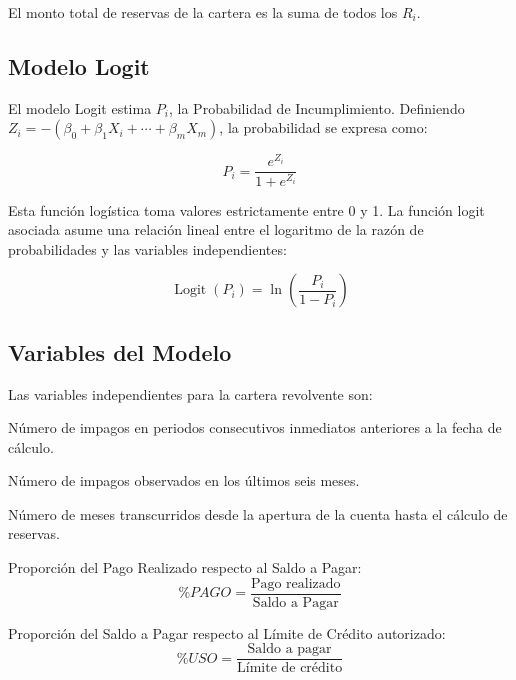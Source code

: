 El monto total de reservas de la cartera es la suma de todos los $R_i$.

\subsection{Modelo Logit}

El modelo Logit estima $P_i$, la Probabilidad de Incumplimiento. Definiendo $Z_i = -(\beta_0 + \beta_1 X_i + \cdots + \beta_m X_m)$, la probabilidad se expresa como:

\begin{equation}
    P_i = \frac{e^{Z_i}}{1 + e^{Z_i}}
\end{equation}

Esta función logística toma valores estrictamente entre 0 y 1. La función logit asociada asume una relación lineal entre el logaritmo de la razón de probabilidades y las variables independientes:

\begin{equation}
    \operatorname{Logit}(P_i) = \ln\!\left(\frac{P_i}{1 - P_i}\right)
\end{equation}

\subsection{Variables del Modelo}

Las variables independientes para la cartera revolvente son:

\begin{description}[leftmargin=2cm, labelwidth=1.8cm]
    \item[$\mathit{ACT}$] Número de impagos en periodos consecutivos inmediatos anteriores a la fecha de cálculo.
    \item[$\mathit{HIST}$] Número de impagos observados en los últimos seis meses.
    \item[$\mathit{ANT}$] Número de meses transcurridos desde la apertura de la cuenta hasta el cálculo de reservas.
    \item[$\%\mathit{PAGO}$] Proporción del Pago Realizado respecto al Saldo a Pagar:
        \begin{equation}
            \%\mathit{PAGO} = \frac{\text{Pago realizado}}{\text{Saldo a Pagar}}
        \end{equation}
    \item[$\%\mathit{USO}$] Proporción del Saldo a Pagar respecto al Límite de Crédito autorizado:
        \begin{equation}
            \%\mathit{USO} = \frac{\text{Saldo a pagar}}{\text{Límite de crédito}}
        \end{equation}
\end{description}

